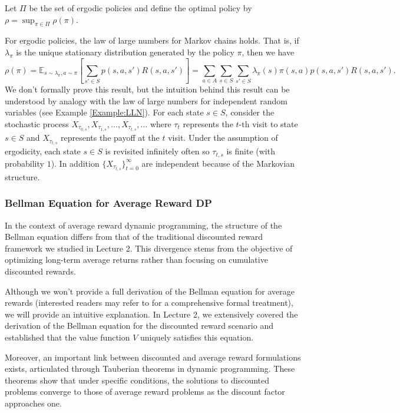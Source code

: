 \documentclass[letter,11pt]{article}
\begin{document}
Let $\Pi$ be the set of ergodic policies and define the optimal policy by $\rho = \sup _{\pi \in \Pi} \rho(\pi )$.

For ergodic policies, the law of large numbers for Markov chains holds. That is, if $\lambda_{\pi}$ is the unique stationary distribution generated by the policy $\pi$, then we have  
\begin{equation} \label{Eq:LawofLargeNumbers}
 \rho(\pi) =  \mathbb{E}_{s \sim \lambda_{\pi}, a \sim \pi} \left [  \sum _{s' \in S} p(s,a,s')    R(s,a,s')  \right ] = \sum _{a \in A} \sum _{s \in S} \sum _{s' \in S} \lambda_{\pi}(s) \pi(s,a) p(s,a,s') R(s,a,s').
\end{equation}
We don't formally prove this result, but the intuition behind this result can be understood by analogy with the law of large numbers for independent random variables (see Example \ref{Example:LLN}). For each state $s \in S$, consider the stochastic process
$X_{\tau_{0,s} }, X_{\tau_{1,s} }, \ldots , X_{\tau_{t,s}}, \ldots $  where $\tau_{t}$ represents the $t$-th visit to state $s \in S$ and $X_{\tau_{t,s} }$ represents the payoff at the $t$ visit. Under the assumption of ergodicity, each state $s \in S$ is revisited infinitely often so $\tau_{t,s}$ is finite (with probability $1$). In addition $ \{ X_{\tau_{t,s} } \}_{t=0}^{\infty}$ are independent because of the Markovian structure. 



\subsubsection{Bellman Equation for Average Reward DP} \label{Sec:Bellman:average}
In the context of average reward dynamic programming, the structure of the Bellman equation differs from that of the traditional discounted reward framework we studied in Lecture 2. This divergence stems from the objective of optimizing long-term average returns rather than focusing on cumulative discounted rewards.

Although we won't provide a full derivation of the Bellman equation for average rewards (interested readers may refer to \cite{bertsekas2012dynamic} for a comprehensive  formal treatment), we will provide an intuitive explanation. In Lecture 2, we extensively covered the derivation of the Bellman equation for the discounted reward scenario and established that the value function 
$V$ uniquely satisfies this equation.

Moreover, an important link between discounted and average reward formulations exists, articulated through Tauberian theorems in dynamic programming. These theorems show that under specific conditions, the solutions to discounted problems converge to those of average reward problems as the discount factor approaches one. 
\end{document}
